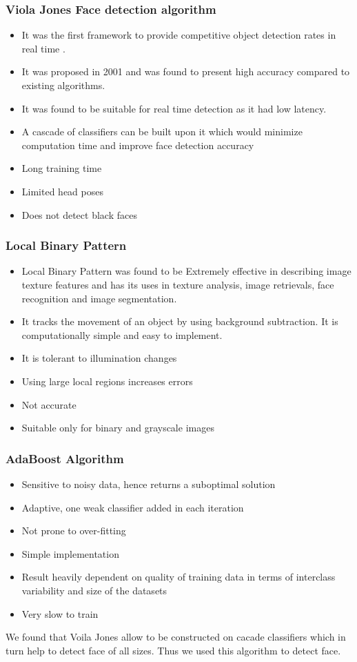 \documentclass[conference]{IEEEtran}
\begin{document}
\subsubsection{Viola Jones Face detection algorithm}
\begin{itemize}
	\item It was the first framework to provide competitive object detection rates in real time \cite{facedet}. 
	\item It was proposed in 2001 and was found to present high accuracy compared to existing algorithms.
	\item It was found to be suitable for real time detection as it had low latency.
	\item A cascade of classifiers can be built upon it which would minimize computation time and improve face detection accuracy
	\item Long training time
	\item Limited head poses
	\item Does not detect black faces
\end{itemize}

\subsubsection{Local Binary Pattern}
\begin{itemize}
	\item Local Binary Pattern was found to be Extremely effective in describing image texture features and has its uses in texture analysis, image retrievals, face recognition and image segmentation. 
	\item It tracks the movement of an object by using background subtraction. It is computationally simple and easy to implement. 
	\item It is tolerant to illumination changes
	\item Using large local regions increases errors
	\item Not accurate
	\item Suitable only for binary and grayscale images
	
\end{itemize}

\subsubsection{AdaBoost Algorithm}
\begin{itemize}
	\item Sensitive to noisy data, hence returns a suboptimal solution
	\item Adaptive, one weak classifier added in each iteration
	\item Not prone to over-fitting
	\item Simple implementation
	\item Result heavily dependent on quality of training data in terms of interclass variability and size of the datasets
	\item Very slow to train
	
\end{itemize}
We found that Voila Jones allow to be constructed on cacade classifiers which in turn help to detect face of all sizes. Thus we used this algorithm to detect face.
\end{document}
